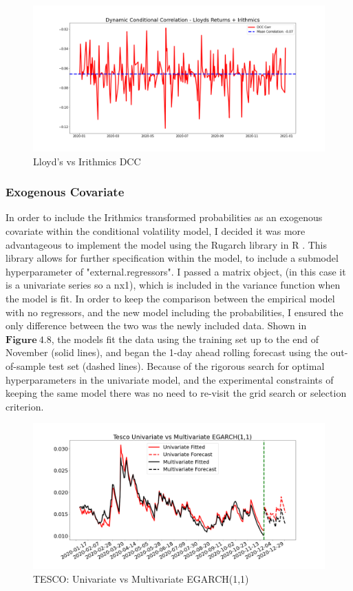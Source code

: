 \begin{figure}[H]
\centering
\includegraphics[scale = 0.30]{images/dcc/plot 1.png}
\caption{Lloyd's vs Irithmics DCC}
\label{fig: DCC Example}
\end{figure}

\subsubsection{Exogenous Covariate}
In order to include the Irithmics transformed probabilities as an exogenous covariate within the conditional volatility model, I decided it was more advantageous to implement the model using the Rugarch library in R \cite{rugarch}. This library allows for further specification within the model, to include a submodel hyperparameter of "external.regressors". I passed a matrix object, (in this case it is a univariate series so a nx1), which is included in the variance function when the model is fit. In order to keep the comparison between the empirical model with no regressors, and the new model including the probabilities, I ensured the only difference between the two was the newly included data. Shown in $\mathbf{Figure~4.8}$, the models fit the data using the training set up to the end of November (solid lines), and began the 1-day ahead rolling forecast using the out-of-sample test set (dashed lines). Because of the rigorous search for optimal hyperparameters in the univariate model, and the experimental constraints of keeping the same model there was no need to re-visit the grid search or selection criterion.  

\begin{figure}[H]
\centering
\includegraphics[scale = 0.30]{images/multiGarch/plot 2.png}
\caption{TESCO: Univariate vs Multivariate EGARCH(1,1)}
\label{fig: MV GARCH Example}
\end{figure}

